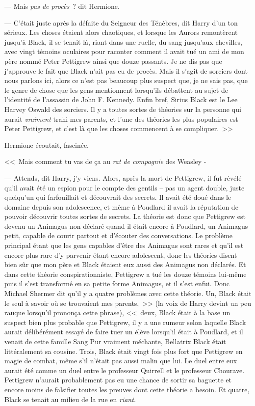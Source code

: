 --- Mais \emph{pas de procès}~? dit Hermione.

--- C'était juste après la défaite du Seigneur des Ténèbres, dit Harry d'un ton sérieux. Les choses étaient alors chaotiques, et lorsque les Aurors remontèrent jusqu'à Black, il se tenait là, riant dans une ruelle, du sang jusqu'aux chevilles, avec vingt témoins oculaires pour raconter comment il avait tué un ami de mon père nommé Peter Pettigrew ainsi que douze passants. Je ne dis pas que j'approuve le fait que Black n'ait pas eu de procès. Mais il s'agit de sorciers dont nous parlons ici, alors ce n'est pas beaucoup plus suspect que, je ne sais pas, que le genre de chose que les gens mentionnent lorsqu'ils débattent au sujet de l'identité de l'assassin de John F. Kennedy. Enfin bref, Sirius Black est le Lee Harvey Oswald des sorciers. Il y a toutes sortes de théories sur la personne qui aurait \emph{vraiment} trahi mes parents, et l'une des théories les plus populaires est Peter Pettigrew, et c'est là que les choses commencent à se compliquer.~>>

Hermione écoutait, fascinée.

<<~Mais comment tu vas de ça au \emph{rat} \emph{de compagnie} des Weasley -

--- Attends, dit Harry, j'y viens. Alors, après la mort de Pettigrew, il fut révélé qu'il avait été un espion pour le compte des gentils -- pas un agent double, juste quelqu'un qui farfouillait et découvrait des secrets. Il avait été doué dans le domaine depuis son adolescence, et même à Poudlard il avait la réputation de pouvoir découvrir toutes sortes de secrets. La théorie est donc que Pettigrew est devenu un Animagus non déclaré quand il était encore à Poudlard, un Animagus petit, capable de courir partout et d'écouter des conversations. Le problème principal étant que les gens capables d'être des Animagus sont rares et qu'il est encore plus rare d'y parvenir étant encore adolescent, donc les théories disent bien sûr que mon père et Black étaient eux aussi des Animagus non déclarés. Et dans cette théorie conspirationniste, Pettigrew a tué les douze témoins lui-même puis il s'est transformé en sa petite forme Animagus, et il s'est enfui. Donc Michael Shermer dit qu'il y a quatre problèmes avec cette théorie. Un, Black était le seul à savoir où se trouvaient mes parents,~>> (la voix de Harry devint un peu rauque lorsqu'il prononça cette phrase), <<~deux, Black était à la base un suspect bien plus probable que Pettigrew, il y a une rumeur selon laquelle Black aurait délibérément essayé de faire tuer un élève lorsqu'il était à Poudlard, et il venait de cette famille Sang Pur vraiment méchante, Bellatrix Black était littéralement sa cousine. Trois, Black était vingt fois plus fort que Pettigrew en magie de combat, même s'il n'était pas aussi malin que lui. Le duel entre eux aurait été comme un duel entre le professeur Quirrell et le professeur Chourave. Pettigrew n'aurait probablement pas eu une chance de sortir sa baguette et encore moins de falsifier toutes les preuves dont cette théorie a besoin. Et quatre, Black se tenait au milieu de la rue en \emph{riant}.

